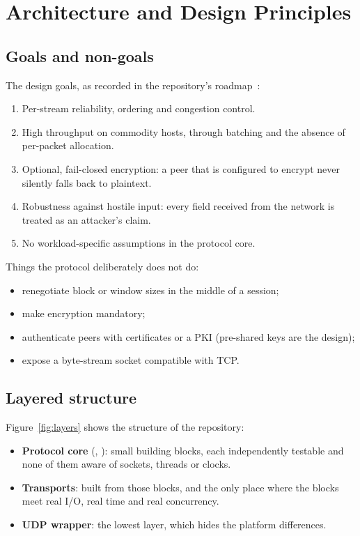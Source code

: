 \chapter{Architecture and Design Principles}\label{ch:arch}

\section{Goals and non-goals}

The design goals, as recorded in the repository's roadmap~\cite{repo}:
\begin{enumerate}
  \item Per-stream reliability, ordering and congestion control.
  \item High throughput on commodity hosts, through batching and the absence of per-packet allocation.
  \item Optional, fail-closed encryption: a peer that is configured to encrypt never silently falls back to
    plaintext.
  \item Robustness against hostile input: every field received from the network is treated as an attacker's
    claim.
  \item No workload-specific assumptions in the protocol core.
\end{enumerate}

\noindent Things the protocol deliberately does not do:
\begin{itemize}
  \item renegotiate block or window sizes in the middle of a session;
  \item make encryption mandatory;
  \item authenticate peers with certificates or a PKI (pre-shared keys are the design);
  \item expose a byte-stream socket compatible with TCP.
\end{itemize}

\section{Layered structure}

Figure~\ref{fig:layers} shows the structure of the repository:
\begin{itemize}
  \item \textbf{Protocol core} (, ): small building blocks, each
    independently testable and none of them aware of sockets, threads or clocks.
  \item \textbf{Transports}: built from those blocks, and the only place where the blocks meet real I/O,
    real time and real concurrency.
  \item \textbf{UDP wrapper}: the lowest layer, which hides the platform differences.
\end{itemize}


